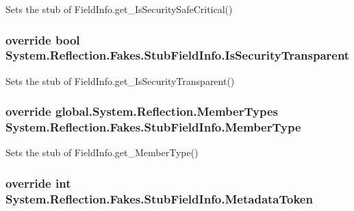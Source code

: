 Sets the stub of Field\-Info.\-get\-\_\-\-Is\-Security\-Safe\-Critical()

\hypertarget{class_system_1_1_reflection_1_1_fakes_1_1_stub_field_info_a298ab20599289ce2339283a1916a164b}{
\subsubsection[{Is\-Security\-Transparent}]{\setlength{\rightskip}{0pt plus 5cm}override bool System.\-Reflection.\-Fakes.\-Stub\-Field\-Info.\-Is\-Security\-Transparent\hspace{0.3cm}{\ttfamily [get]}}}\label{class_system_1_1_reflection_1_1_fakes_1_1_stub_field_info_a298ab20599289ce2339283a1916a164b}


Sets the stub of Field\-Info.\-get\-\_\-\-Is\-Security\-Transparent()

\hypertarget{class_system_1_1_reflection_1_1_fakes_1_1_stub_field_info_ab8fe324b67cac4232f27bc51886dcefe}{
\subsubsection[{Member\-Type}]{\setlength{\rightskip}{0pt plus 5cm}override global.\-System.\-Reflection.\-Member\-Types System.\-Reflection.\-Fakes.\-Stub\-Field\-Info.\-Member\-Type\hspace{0.3cm}{\ttfamily [get]}}}\label{class_system_1_1_reflection_1_1_fakes_1_1_stub_field_info_ab8fe324b67cac4232f27bc51886dcefe}


Sets the stub of Field\-Info.\-get\-\_\-\-Member\-Type()

\hypertarget{class_system_1_1_reflection_1_1_fakes_1_1_stub_field_info_aaa049812925b6758be968d466a9db844}{
\subsubsection[{Metadata\-Token}]{\setlength{\rightskip}{0pt plus 5cm}override int System.\-Reflection.\-Fakes.\-Stub\-Field\-Info.\-Metadata\-Token\hspace{0.3cm}{\ttfamily [get]}}}\label{class_system_1_1_reflection_1_1_fakes_1_1_stub_field_info_aaa049812925b6758be968d466a9db844}



